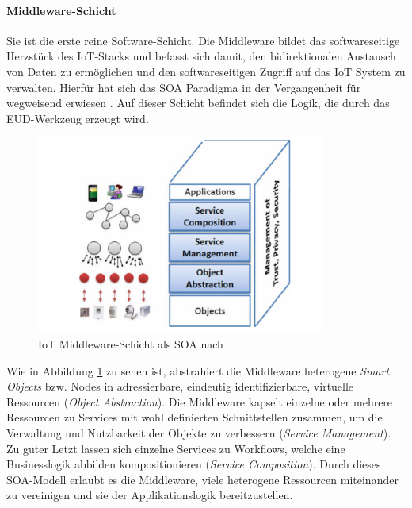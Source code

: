 \paragraph{Middleware-Schicht} Sie ist die erste reine Software-Schicht. Die Middleware bildet das softwareseitige Herzstück des \ac{IoT}-Stacks und befasst sich damit, den bidirektionalen Austausch von Daten zu ermöglichen und den softwareseitigen Zugriff auf das \ac{IoT} System zu verwalten. Hierfür hat sich das \ac{SOA} Paradigma in der Vergangenheit für wegweisend erwiesen \cite{laliwala2008event}. Auf dieser Schicht befindet sich die Logik, die durch das \ac{EUD}-Werkzeug erzeugt wird.
\begin{figure}[h]
    \centering
    \includegraphics[width=0.85\textwidth]{bilder/chapter2/iotsoa.png}
    \caption{IoT Middleware-Schicht als \ac{SOA} nach \cite{bandyopadhyay2011internet}}
    \label{fig:iotsoa}
\end{figure}
Wie in Abbildung \ref{fig:iotsoa} zu sehen ist, abstrahiert die Middleware heterogene \textit{Smart Objects} bzw. Nodes in adressierbare, eindeutig identifizierbare, virtuelle Ressourcen (\textit{Object Abstraction}). Die Middleware kapselt einzelne oder mehrere Ressourcen zu Services mit wohl definierten Schnittstellen zusammen, um die Verwaltung und Nutzbarkeit der Objekte zu verbessern (\textit{Service Management}). Zu guter Letzt lassen sich einzelne Services zu Workflows, welche eine Businesslogik abbilden kompositionieren (\textit{Service Composition}). Durch dieses \ac{SOA}-Modell erlaubt es die Middleware, viele heterogene Ressourcen miteinander zu vereinigen und sie der Applikationslogik bereitzustellen. 

